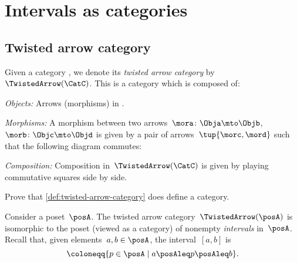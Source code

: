 

\section{Intervals as categories}

\subsection{Twisted arrow category}

\begin{ctdefinition}
    \label{def:twisted-arrow-category}
    \label{def:twisted-arrow}
    Given a category \CatC, we denote its \emph{twisted arrow category} by~$\TwistedArrow(\CatC)$.
    This is a category which is composed of:
    \begin{compactenum}
        \item \emph{Objects:} Arrows (morphisms) in \CatC.
        \item \emph{Morphisms:} A morphism between two arrows~$\mora\colon \Obja \mto \Objb $,~$\morb\colon \Objc \mto \Objd$ is given by a pair of arrows~$\tup{\morc,\mord}$ such that the following diagram commutes:
        \begin{center}
        \end{center}
        \item \emph{Composition:} Composition in~$\TwistedArrow(\CatC)$ is given by playing commutative squares side by side.
    \end{compactenum}
\end{ctdefinition}

\begin{gradedexercise}
    \label{ex:TwistedCat}
    Prove that \cref{def:twisted-arrow-category} does define a category.
\end{gradedexercise}



\begin{example}[Intervals]
    \label{exa:twisted-arrow-poset}
    Consider a poset~$\posA$.
    The twisted arrow category~$\TwistedArrow(\posA)$ is isomorphic to the poset (viewed as a category) of nonempty \emph{intervals} in~$\posA$.
    Recall that, given elements~$a, b \in \posA$, the interval~$[a,b]$ is
    \begin{equation*}
    [a,b]
        \coloneqq \{p \in \posA \mid a\posAleq p \posAleq b\}.
    \end{equation*}
\end{example}

